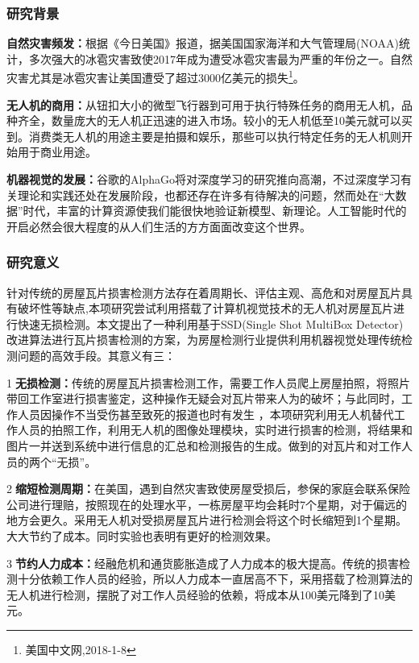 \subsubsection{研究背景}
\textbf{自然灾害频发：}根据《今日美国》报道，据美国国家海洋和大气管理局(NOAA)统计，多次强大的冰雹灾害致使2017年成为遭受冰雹灾害最为严重的年份之一。自然灾害尤其是冰雹灾害让美国遭受了超过3000亿美元的损失\footnote{美国中文网,2018-1-8}。

\textbf{无人机的商用：}从钮扣大小的微型飞行器到可用于执行特殊任务的商用无人机，品种齐全，数量庞大的无人机正迅速的进入市场。较小的无人机低至10美元就可以买到。消费类无人机的用途主要是拍摄和娱乐，那些可以执行特定任务的无人机则开始用于商业用途。

\textbf{机器视觉的发展：}谷歌的AlphaGo将对深度学习的研究推向高潮，不过深度学习有关理论和实践还处在发展阶段，也都还存在许多有待解决的问题，然而处在“大数据”时代，丰富的计算资源使我们能很快地验证新模型、新理论。人工智能时代的开启必然会很大程度的从人们生活的方方面面改变这个世界。

\subsubsection{研究意义}
针对传统的房屋瓦片损害检测方法存在着周期长、评估主观、高危和对房屋瓦片具有破坏性等缺点,本项研究尝试利用搭载了计算机视觉技术的无人机对房屋瓦片进行快速无损检测。本文提出了一种利用基于SSD(Single Shot MultiBox Detector)\cite{ssd}改进算法进行瓦片损害检测的方案，为房屋检测行业提供利用机器视觉处理传统检测问题的高效手段。其意义有三：

\textcircled{1}\textbf{无损检测：}传统的房屋瓦片损害检测工作，需要工作人员爬上房屋拍照，将照片带回工作室进行损害鉴定，这种操作无疑会对瓦片带来人为的破坏；与此同时，工作人员因操作不当受伤甚至致死的报道也时有发生 ，本项研究利用无人机替代工作人员的拍照工作，利用无人机的图像处理模块，实时进行损害的检测，将结果和图片一并送到系统中进行信息的汇总和检测报告的生成。做到的对瓦片和对工作人员的两个“无损”。

\textcircled{2}\textbf{缩短检测周期：}在美国，遇到自然灾害致使房屋受损后，参保的家庭会联系保险公司进行理赔，按照现在的处理水平，一栋房屋平均会耗时7个星期，对于偏远的地方会更久。采用无人机对受损房屋瓦片进行检测会将这个时长缩短到1个星期。大大节约了成本。同时实验也表明有更好的检测效果。

\textcircled{3}\textbf{节约人力成本：}经融危机和通货膨胀造成了人力成本的极大提高。传统的损害检测十分依赖工作人员的经验，所以人力成本一直居高不下，采用搭载了检测算法的无人机进行检测，摆脱了对工作人员经验的依赖，将成本从100美元降到了10美元。